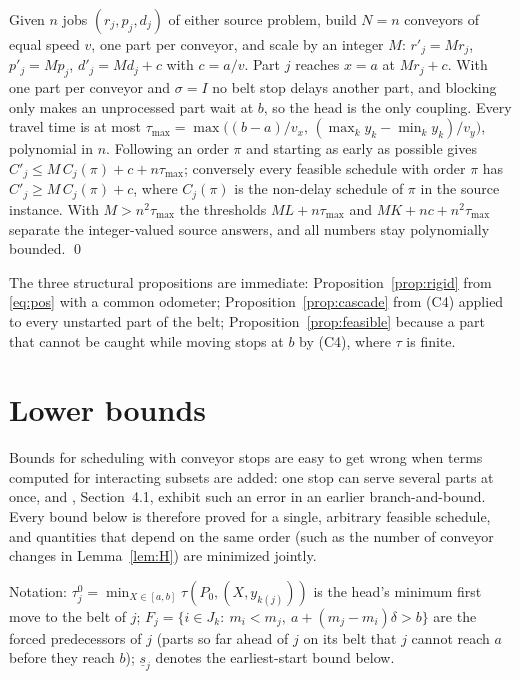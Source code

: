\documentclass[11pt,a4paper]{article}
\theoremstyle{plain}
\theoremstyle{definition}
\theoremstyle{remark}
\begin{document}
Given $n$ jobs $(r_j,p_j,d_j)$ of either source problem, build $N=n$ conveyors of
equal speed $v$, one part per conveyor, and scale by an integer $M$: $r'_j=Mr_j$,
$p'_j=Mp_j$, $d'_j=Md_j+c$ with $c=a/v$. Part $j$ reaches $x=a$ at $Mr_j+c$. With one part
per conveyor and $\sigma=I$ no belt stop delays another part, and blocking only makes an
unprocessed part wait at $b$, so the head is the only coupling. Every travel time is at
most $\tau_{\max}=\max\bigl((b-a)/v_x,\,(\max_ky_k-\min_ky_k)/v_y\bigr)$, polynomial in
$n$. Following an order $\pi$ and starting as early as possible gives
$C'_j\le M\,C_j(\pi)+c+n\tau_{\max}$; conversely every feasible schedule with order $\pi$
has $C'_j\ge M\,C_j(\pi)+c$, where $C_j(\pi)$ is the non-delay schedule of $\pi$ in the
source instance. With $M>n^2\tau_{\max}$ the thresholds $ML+n\tau_{\max}$ and
$MK+nc+n^2\tau_{\max}$ separate the integer-valued source answers, and all numbers stay
polynomially bounded. \qed

The three structural propositions are immediate: Proposition~\ref{prop:rigid} from
\eqref{eq:pos} with a common odometer; Proposition~\ref{prop:cascade} from (C4) applied to
every unstarted part of the belt; Proposition~\ref{prop:feasible} because a part that
cannot be caught while moving stops at $b$ by (C4), where $\tau$ is finite.

\section{Lower bounds}\label{app:bounds}
Bounds for scheduling with conveyor stops are easy to get wrong when terms computed for
interacting subsets are added: one stop can serve several parts at once, and
\cite{Tamura2011}, Section~4.1, exhibit such an error in an earlier branch-and-bound. Every
bound below is therefore proved for a single, arbitrary feasible schedule, and quantities
that depend on the same order (such as the number of conveyor changes in Lemma~\ref{lem:H})
are minimized jointly.

Notation: $\tau^0_j=\min_{X\in[a,b]}\tau(P_0,(X,y_{k(j)}))$ is the head's minimum first
move to the belt of $j$; $F_j=\{i\in J_k:\ m_i<m_j,\ a+(m_j-m_i)\delta>b\}$ are the forced
predecessors of $j$ (parts so far ahead of $j$ on its belt that $j$ cannot reach $a$ before
they reach $b$); $\underline s_j$ denotes the earliest-start bound below.
\end{document}

